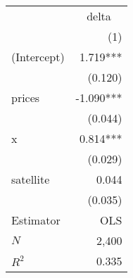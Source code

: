 \begin{tabular}{lr}
\toprule
            & \multicolumn{1}{c}{delta} \\ 
\cmidrule(lr){2-2} 
            &                       (1) \\ 
\midrule
(Intercept) &                  1.719*** \\ 
            &                   (0.120) \\ 
prices      &                 -1.090*** \\ 
            &                   (0.044) \\ 
x           &                  0.814*** \\ 
            &                   (0.029) \\ 
satellite   &                     0.044 \\ 
            &                   (0.035) \\ 
\midrule
Estimator   &                       OLS \\ 
\midrule
$N$         &                     2,400 \\ 
$R^2$       &                     0.335 \\ 
\bottomrule
\end{tabular}
